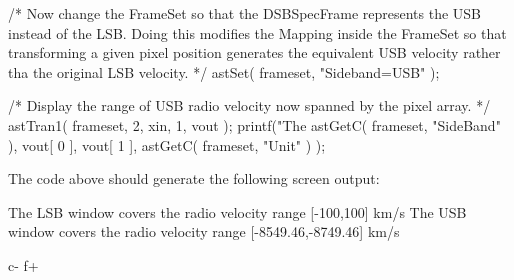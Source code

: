 \documentclass[twoside,11pt]{starlink}
\begin{document}
\begin{terminalv}
/* Now change the FrameSet so that the DSBSpecFrame represents the USB
   instead of the LSB. Doing this modifies the Mapping inside the
   FrameSet so that transforming a given pixel position generates the
   equivalent USB velocity rather tha the original LSB velocity. */
   astSet( frameset, "Sideband=USB" );

/* Display the range of USB radio velocity now spanned by the pixel
   array. */
   astTran1( frameset, 2, xin, 1, vout );
   printf("The %
          astGetC( frameset, "SideBand" ), vout[ 0 ], vout[ 1 ],
          astGetC( frameset, "Unit" ) );
\end{terminalv}
\normalsize
The code above should generate the following screen output:
\small
\begin{terminalv}
The LSB window covers the radio velocity range [-100,100] km/s
The USB window covers the radio velocity range [-8549.46,-8749.46] km/s
\end{terminalv}
\normalsize
c-
f+
\small
\end{document}
